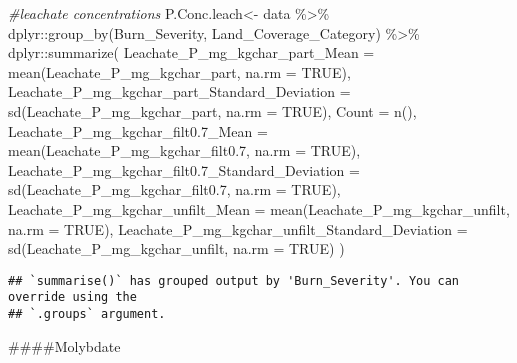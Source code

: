 \documentclass[
]{article}
\newenvironment{Shaded}{\begin{snugshade}}{\end{snugshade}}
\newcommand{\AttributeTok}[1]{\textcolor[rgb]{0.77,0.63,0.00}{#1}}
\newcommand{\CommentTok}[1]{\textcolor[rgb]{0.56,0.35,0.01}{\textit{#1}}}
\newcommand{\ConstantTok}[1]{\textcolor[rgb]{0.00,0.00,0.00}{#1}}
\newcommand{\FloatTok}[1]{\textcolor[rgb]{0.00,0.00,0.81}{#1}}
\newcommand{\FunctionTok}[1]{\textcolor[rgb]{0.00,0.00,0.00}{#1}}
\newcommand{\NormalTok}[1]{#1}
\newcommand{\OtherTok}[1]{\textcolor[rgb]{0.56,0.35,0.01}{#1}}
\newcommand{\SpecialCharTok}[1]{\textcolor[rgb]{0.00,0.00,0.00}{#1}}
\begin{document}
\begin{Shaded}
\begin{Highlighting}[]
\CommentTok{\#leachate concentrations}
\NormalTok{P.Conc.leach}\OtherTok{\textless{}{-}}\NormalTok{ data }\SpecialCharTok{\%\textgreater{}\%}
\NormalTok{  dplyr}\SpecialCharTok{::}\FunctionTok{group\_by}\NormalTok{(Burn\_Severity, Land\_Coverage\_Category) }\SpecialCharTok{\%\textgreater{}\%}
\NormalTok{  dplyr}\SpecialCharTok{::}\FunctionTok{summarize}\NormalTok{(}
    \AttributeTok{Leachate\_P\_mg\_kgchar\_part\_Mean =} \FunctionTok{mean}\NormalTok{(Leachate\_P\_mg\_kgchar\_part, }\AttributeTok{na.rm =} \ConstantTok{TRUE}\NormalTok{),}
    \AttributeTok{Leachate\_P\_mg\_kgchar\_part\_Standard\_Deviation =} \FunctionTok{sd}\NormalTok{(Leachate\_P\_mg\_kgchar\_part, }\AttributeTok{na.rm =} \ConstantTok{TRUE}\NormalTok{),}
    \AttributeTok{Count =} \FunctionTok{n}\NormalTok{(),}
    \AttributeTok{Leachate\_P\_mg\_kgchar\_filt0.7\_Mean =} \FunctionTok{mean}\NormalTok{(Leachate\_P\_mg\_kgchar\_filt0}\FloatTok{.7}\NormalTok{, }\AttributeTok{na.rm =} \ConstantTok{TRUE}\NormalTok{),}
    \AttributeTok{Leachate\_P\_mg\_kgchar\_filt0.7\_Standard\_Deviation =} \FunctionTok{sd}\NormalTok{(Leachate\_P\_mg\_kgchar\_filt0}\FloatTok{.7}\NormalTok{, }\AttributeTok{na.rm =} \ConstantTok{TRUE}\NormalTok{),}
    \AttributeTok{Leachate\_P\_mg\_kgchar\_unfilt\_Mean =} \FunctionTok{mean}\NormalTok{(Leachate\_P\_mg\_kgchar\_unfilt, }\AttributeTok{na.rm =} \ConstantTok{TRUE}\NormalTok{),}
    \AttributeTok{Leachate\_P\_mg\_kgchar\_unfilt\_Standard\_Deviation =} \FunctionTok{sd}\NormalTok{(Leachate\_P\_mg\_kgchar\_unfilt, }\AttributeTok{na.rm =} \ConstantTok{TRUE}\NormalTok{)}
\NormalTok{  )}
\end{Highlighting}
\end{Shaded}

\begin{verbatim}
## `summarise()` has grouped output by 'Burn_Severity'. You can override using the
## `.groups` argument.
\end{verbatim}

\#\#\#\#Molybdate
\end{document}
